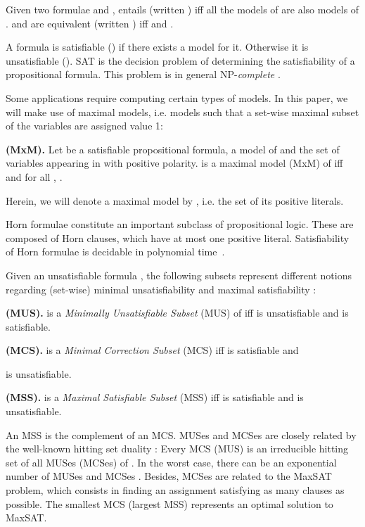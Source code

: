 \documentclass{llncs}
\begin{document}
Given two formulae  and ,  entails  (written ) iff all the models of  are also models of .  and  are equivalent (written ) iff  and . 

A formula  is satisfiable () if there exists a model for it. Otherwise it is unsatisfiable (). SAT is the decision problem of determining the satisfiability of a propositional formula. This problem is in general NP-\textit{complete} \cite{cook-stoc71}.

Some applications require computing certain types of models. In this paper, we will make use of maximal models, i.e. models such that a set-wise maximal subset of the variables are assigned value 1:

\begin{definition}\label{mxm}
\textbf{(MxM). } Let  be a satisfiable propositional formula,  a model of  and  the set of variables appearing in  with positive polarity.  is a maximal model (MxM) of  iff  and for all , . 
\end{definition}

Herein, we will denote a maximal model by , i.e. the set of its positive literals.


Horn formulae constitute an important subclass of propositional logic. These are composed of Horn clauses, which have at most one positive literal. Satisfiability of Horn formulae is decidable in polynomial time~\cite{gallier-jlp84,itai-jlp87,minoux-ipl88}.


Given an unsatisfiable formula , the following subsets represent different notions regarding (set-wise) minimal unsatisfiability and maximal satisfiability \cite{liffiton-jar08,mshjpb-ijcai13}:

\begin{definition} \label{def:mus}
\textbf{(MUS).}  is a {\em Minimally Unsatisfiable Subset}
(MUS) of  iff  is unsatisfiable and
 is satisfiable.
\end{definition}
\begin{definition} \label{def:mcs}
\textbf{(MCS).}  is a {\em Minimal Correction Subset} (MCS)
iff  is satisfiable and

is unsatisfiable.
\end{definition}
\begin{definition} \label{def:mss}
\textbf{(MSS).}  is a {\em Maximal Satisfiable Subset} (MSS)
iff  is satisfiable and
 is
unsatisfiable.
\end{definition}

An MSS is the complement of an MCS. MUSes and MCSes are closely related by the well-known hitting set duality \cite{reiter-aij87,stuckey-padl05,lozinskii-jetai03,slaney-ecai14}: Every MCS (MUS) is an irreducible hitting set of all MUSes (MCSes) of  . In the worst case, there can be an exponential number of MUSes and MCSes \cite{liffiton-jar08,osullivan-aaai07}. Besides, MCSes are related to the MaxSAT problem, which consists in finding an assignment satisfying as many clauses as possible. The smallest MCS (largest MSS) represents an optimal solution to MaxSAT.
\end{document}
